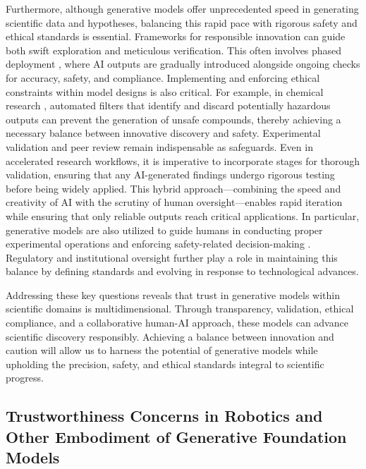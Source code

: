 Furthermore, although generative models offer unprecedented speed in generating scientific data and hypotheses, balancing this rapid pace with rigorous safety and ethical standards is essential. Frameworks for responsible innovation can guide both swift exploration and meticulous verification. This often involves phased deployment \cite{elemento2021artificial,kaur2023artificial,miotto2018deep,van2016deep}, where AI outputs are gradually introduced alongside ongoing checks for accuracy, safety, and compliance. Implementing and enforcing ethical constraints within model designs is also critical. For example, in chemical research \cite{gromski2019explore}, automated filters that identify and discard potentially hazardous outputs can prevent the generation of unsafe compounds, thereby achieving a necessary balance between innovative discovery and safety. Experimental validation and peer review remain indispensable as safeguards. Even in accelerated research workflows, it is imperative to incorporate stages for thorough validation, ensuring that any AI-generated findings undergo rigorous testing before being widely applied. This hybrid approach—combining the speed and creativity of AI with the scrutiny of human oversight—enables rapid iteration while ensuring that only reliable outputs reach critical applications. In particular, generative models are also utilized to guide humans in conducting proper experimental operations and enforcing safety-related decision-making \cite{zhou2024labsafety,ramos2024review,boiko2023autonomous}. Regulatory and institutional oversight further play a role in maintaining this balance by defining standards and evolving in response to technological advances.

Addressing these key questions reveals that trust in generative models within scientific domains is multidimensional. Through transparency, validation, ethical compliance, and a collaborative human-AI approach, these models can advance scientific discovery responsibly. Achieving a balance between innovation and caution will allow us to harness the potential of generative models while upholding the precision, safety, and ethical standards integral to scientific progress.



\subsection{Trustworthiness Concerns in Robotics and Other Embodiment of Generative Foundation Models}


